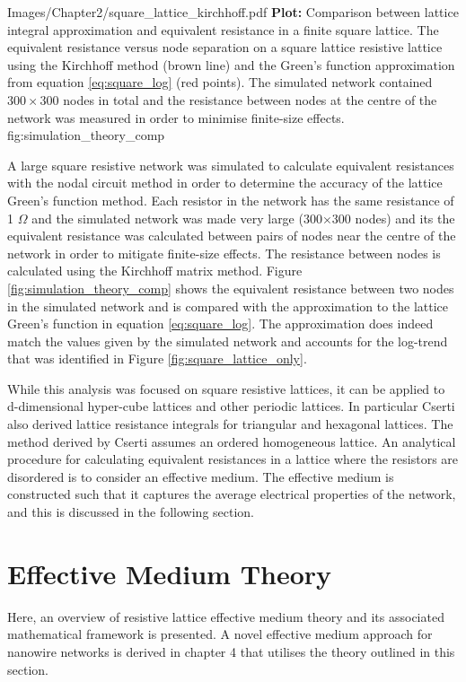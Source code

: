 {Images/Chapter2/square_lattice_kirchhoff.pdf}
{\textbf{Plot:} Comparison between lattice integral approximation and equivalent resistance in a finite square lattice.}
{The equivalent resistance versus node separation on a square lattice resistive lattice using the Kirchhoff method (brown line) and the Green's function approximation from equation \ref{eq:square_log} (red points). The simulated network contained $300\times 300$ nodes in total and the resistance between nodes at the centre of the network was measured in order to minimise finite-size effects.}
{fig:simulation_theory_comp}

A large square resistive network was simulated to calculate equivalent resistances with the nodal circuit method in order to determine the accuracy of the lattice Green's function method. Each resistor in the network has the same resistance of 1 $\Omega$ and the simulated network was made very large (300$\times$300 nodes) and its the equivalent resistance was calculated between pairs of nodes near the centre of the network in order to mitigate finite-size effects. The resistance between nodes is calculated using the Kirchhoff matrix method. Figure \ref{fig:simulation_theory_comp} shows the equivalent resistance between two nodes in the simulated network and is compared with the approximation to the lattice Green's function in equation \ref{eq:square_log}. The approximation does indeed match the values given by the simulated network and accounts for the log-trend that was identified in Figure \ref{fig:square_lattice_only}.

While this analysis was focused on square resistive lattices, it can be applied to d-dimensional hyper-cube lattices and other periodic lattices. In particular Cserti also derived lattice resistance integrals for triangular and hexagonal lattices\cite{cserti2000}. The method derived by Cserti assumes an ordered homogeneous lattice. An analytical procedure for calculating equivalent resistances in a lattice where the resistors are disordered is to consider an effective medium. The effective medium is constructed such that it captures the average electrical properties of the network, and this is discussed in the following section.

\section{Effective Medium Theory}
\label{sec: EMT intro}
Here, an overview of resistive lattice effective medium theory and its associated mathematical framework is presented. A novel effective medium approach for nanowire networks is derived in chapter 4 that utilises the theory outlined in this section.


